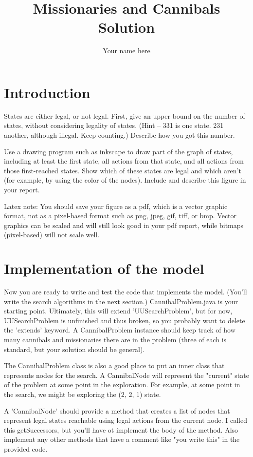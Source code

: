 \documentclass{article}
\title{Missionaries and Cannibals Solution}
\author{Your name here}
\begin{document}
\maketitle

\section{Introduction}
States are either legal, or not legal. First, give an upper bound on the number of states, without considering legality of states. (Hint -- 331 is one state. 231 another, although illegal. Keep counting.) Describe how you got this number.

Use a drawing program such as inkscape to draw part of the graph of states, including at least the first state, all actions from that state, and all actions from those first-reached states. Show which of these states are legal and which aren't (for example, by using the color of the nodes). Include and describe this figure in your report.

Latex note: You should save your figure as a pdf, which is a vector graphic format, not as a pixel-based format such as png, jpeg, gif, tiff, or bmp. Vector graphics can be scaled and will still look good in your pdf report, while bitmaps (pixel-based) will not scale well.



\section{Implementation of the model}
Now you are ready to write and test the code that implements the model. (You'll write the search algorithms in the next section.) CannibalProblem.java is your starting point. Ultimately, this will extend 'UUSearchProblem', but for now, UUSearchProblem is unfinished and thus broken, so you probably want to delete the 'extends' keyword.
A CannibalProblem instance should keep track of how many cannibals and missionaries there are in the problem (three of each is standard, but your solution should be general).

The CannibalProblem class is also a good place to put an inner class that represents nodes for the search. A CannibalNode will represent the "current" state of the problem at some point in the exploration. For example, at some point in the search, we might be exploring the (2, 2, 1) state.

A 'CannibalNode' should provide a method that creates a list of nodes that represent legal states reachable using legal actions from the current node. I called this getSuccessors, but you'll have ot implement the body of the method. Also implement any other methods that have a comment like "you write this" in the provided code.
\end{document}

